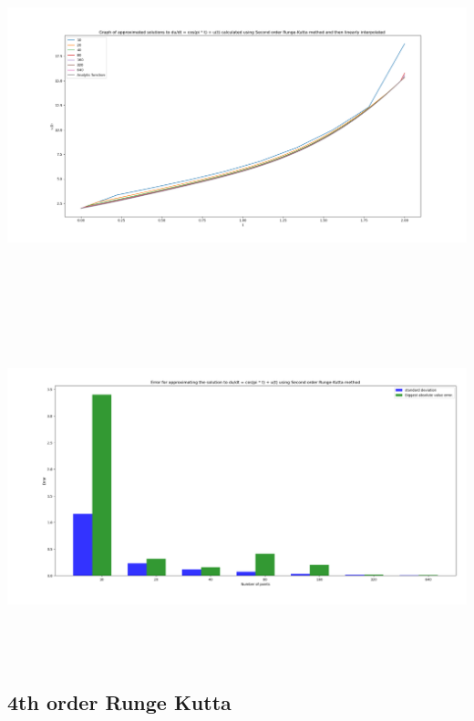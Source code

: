 \documentclass[10pt]{article}
\begin{document}
\begin{center}
\includegraphics[angle=0,height=10cm]{./img/runge_2_function.png}
\end{center}

\begin{center}
\includegraphics[angle=0,height=10cm]{./img/runge_2_error.png}
\end{center}




\subsection{4th order Runge Kutta}
\label{sec:orgd94704c}
\end{document}
